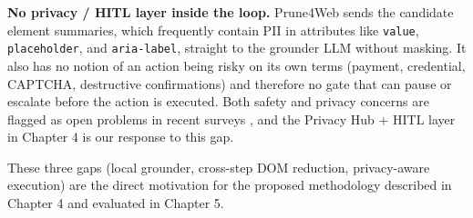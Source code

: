 \textbf{No privacy / HITL layer inside the loop.}
Prune4Web sends the candidate element summaries, which frequently contain PII in attributes like \texttt{value}, \texttt{placeholder}, and \texttt{aria-label}, straight to the grounder LLM without masking. It also has no notion of an action being risky on its own terms (payment, credential, CAPTCHA, destructive confirmations) and therefore no gate that can pause or escalate before the action is executed. Both safety and privacy concerns are flagged as open problems in recent surveys \cite{tang2025surveymllmbasedguiagents} \cite{ning2025surveywebagentsnextgenerationai}, and the Privacy Hub + HITL layer in Chapter 4 is our response to this gap.

\bigskip
\noindent These three gaps (local grounder, cross-step DOM reduction, privacy-aware execution) are the direct motivation for the proposed methodology described in Chapter 4 and evaluated in Chapter 5.

